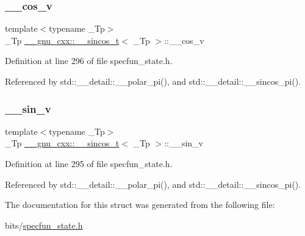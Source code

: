 \subsubsection{\texorpdfstring{\+\_\+\+\_\+cos\+\_\+v}{\_\_cos\_v}}
{\footnotesize\ttfamily template$<$typename \+\_\+\+Tp$>$ \\
\+\_\+\+Tp \hyperlink{struct____gnu__cxx_1_1____sincos__t}{\+\_\+\+\_\+gnu\+\_\+cxx\+::\+\_\+\+\_\+sincos\+\_\+t}$<$ \+\_\+\+Tp $>$\+::\+\_\+\+\_\+cos\+\_\+v}



Definition at line 296 of file specfun\+\_\+state.\+h.



Referenced by std\+::\+\_\+\+\_\+detail\+::\+\_\+\+\_\+polar\+\_\+pi(), and std\+::\+\_\+\+\_\+detail\+::\+\_\+\+\_\+sincos\+\_\+pi().

\mbox{\label{struct____gnu__cxx_1_1____sincos__t_a22a21d9a5658097549cbca39b891fd27}} 
\subsubsection{\texorpdfstring{\+\_\+\+\_\+sin\+\_\+v}{\_\_sin\_v}}
{\footnotesize\ttfamily template$<$typename \+\_\+\+Tp$>$ \\
\+\_\+\+Tp \hyperlink{struct____gnu__cxx_1_1____sincos__t}{\+\_\+\+\_\+gnu\+\_\+cxx\+::\+\_\+\+\_\+sincos\+\_\+t}$<$ \+\_\+\+Tp $>$\+::\+\_\+\+\_\+sin\+\_\+v}



Definition at line 295 of file specfun\+\_\+state.\+h.



Referenced by std\+::\+\_\+\+\_\+detail\+::\+\_\+\+\_\+polar\+\_\+pi(), and std\+::\+\_\+\+\_\+detail\+::\+\_\+\+\_\+sincos\+\_\+pi().



The documentation for this struct was generated from the following file\+:\begin{DoxyCompactItemize}
\item 
bits/\hyperlink{specfun__state_8h}{specfun\+\_\+state.\+h}\end{DoxyCompactItemize}
